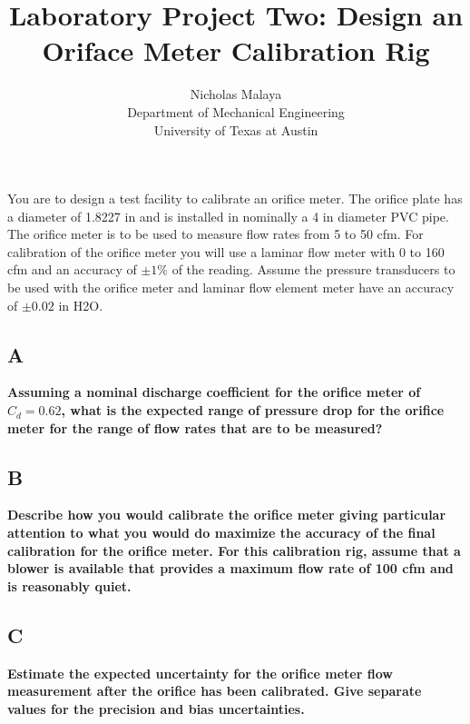 \documentclass{article}
\title{\bf{Laboratory Project Two: Design an Oriface Meter Calibration Rig}}
\author{Nicholas Malaya \\ Department of Mechanical Engineering \\ University of Texas at Austin} \date{}
\begin{document}
\maketitle
\date{}

You are to design a test facility to calibrate an orifice meter. The orifice plate has a diameter of
1.8227 in and is installed in nominally a 4 in diameter PVC pipe. The orifice meter is to be used 
to measure flow rates from 5 to 50 cfm. For calibration of the orifice meter you will use a 
laminar flow meter with 0 to 160 cfm and an accuracy of $\pm 1\%$ of the reading. Assume the 
pressure transducers to be used with the orifice meter and laminar flow element meter have an 
accuracy of $\pm 0.02$ in H2O.

\subsection*{A}
\textbf{Assuming a nominal discharge coefficient for the orifice meter of $C_d = 0.62$, what is the
expected range of pressure drop for the orifice meter for the range of flow rates that are to be 
measured?}


\subsection*{B}
\textbf{Describe how you would calibrate the orifice meter giving particular attention to what you
would do maximize the accuracy of the final calibration for the orifice meter. For this 
calibration rig, assume that a blower is available that provides a maximum flow rate of 100 
cfm and is reasonably quiet.}

\subsection*{C}
\textbf{Estimate the expected uncertainty for the orifice meter flow measurement after the orifice has
been calibrated. Give separate values for the precision and bias uncertainties.}
\end{document}

